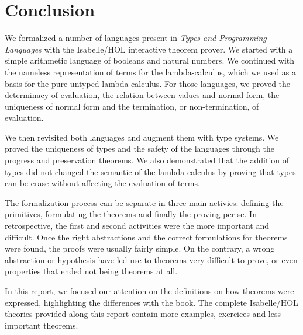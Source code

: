 \section{Conclusion}

We formalized a number of languages present in \emph{Types and Programming Languages} with the
Isabelle/HOL interactive theorem prover. We started with a simple arithmetic language of booleans
and natural numbers. We continued with the nameless representation of terms for the lambda-calculus,
which we used as a basis for the pure untyped lambda-calculus. For those languages, we proved the
determinacy of evaluation, the relation between values and normal form, the uniqueness of normal
form and the termination, or non-termination, of evaluation.

We then revisited both languages and augment them with type systems. We proved the uniqueness of
types and the safety of the languages through the progress and preservation theorems. We also
demonstrated that the addition of types did not changed the semantic of the lambda-calculus by
proving that types can be erase without affecting the evaluation of terms.

The formalization process can be separate in three main activies: defining the primitives,
formulating the theorems and finally the proving per se. In retrospective, the first and second
activities were the more important and difficult. Once the right abstractions and the correct
formulations for theorems were found, the proofs were usually fairly simple. On the contrary, a
wrong abstraction or hypothesis have led use to theorems very difficult to prove, or even properties
that ended not being theorems at all.

In this report, we focused our attention on the definitions on how theorems were expressed,
highlighting the differences with the book. The complete Isabelle/HOL theories provided along this
report contain more examples, exercices and less important theorems.

